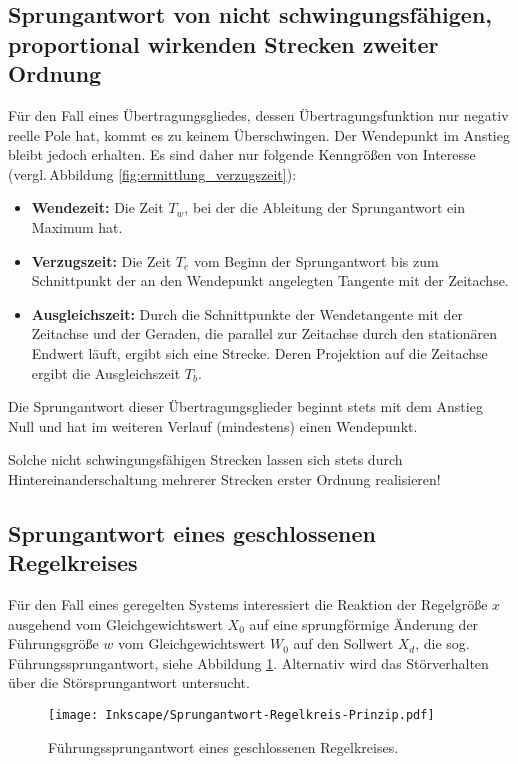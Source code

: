 \subsection{Sprungantwort von nicht schwingungsfähigen, proportional wirkenden Strecken zweiter Ordnung}
\label{sec:pt_2-glied-nicht}
Für den Fall eines Übertragungsgliedes, dessen Übertragungsfunktion nur negativ reelle Pole hat, kommt es zu keinem Überschwingen. Der Wendepunkt im Anstieg bleibt jedoch erhalten.
Es sind daher nur folgende Kenngrößen von Interesse (vergl.\,Abbildung \ref{fig:ermittlung_verzugszeit}):
\begin{itemize}
    \item \textbf{Wendezeit:} Die Zeit $T_w$, bei der die Ableitung der Sprungantwort ein Maximum hat.
    \item \textbf{Verzugszeit:} Die Zeit $T_e$ vom Beginn der Sprungantwort bis zum Schnittpunkt der an den Wendepunkt angelegten Tangente mit der Zeitachse.
    \item \textbf{Ausgleichszeit:} Durch die Schnittpunkte der Wendetangente mit der Zeitachse und der Geraden, die parallel zur Zeitachse durch den stationären Endwert läuft, ergibt sich eine Strecke. Deren Projektion auf die Zeitachse ergibt die Ausgleichszeit $T_b$.
\end{itemize}
Die Sprungantwort dieser Übertragungsglieder beginnt stets mit dem Anstieg Null und hat im weiteren Verlauf (mindestens) einen Wendepunkt.
\begin{RstWichtigBox}
    Solche nicht schwingungsfähigen Strecken lassen sich stets
    durch Hintereinanderschaltung mehrerer Strecken erster Ordnung
    realisieren!
\end{RstWichtigBox}
\subsection{Sprungantwort eines geschlossenen Regelkreises} \label{sec:SprungantwortRegelkreis}
Für den Fall eines geregelten Systems interessiert die Reaktion der Regelgröße $x$ ausgehend vom Gleichgewichtswert $X_0$ auf eine sprungförmige Änderung der Führungsgröße $w$ vom Gleichgewichtswert $W_0$ auf den Sollwert $X_d$, die sog.\,Führungssprungantwort, siehe Abbildung \ref{fig:Sprungantwort-RK-Prinzip}. Alternativ wird das Störverhalten über die Störsprungantwort untersucht.
\begin{figure}[ht]
    \centering
    \texttt{[image: Inkscape/Sprungantwort-Regelkreis-Prinzip.pdf]}
    \caption{Führungssprungantwort eines geschlossenen Regelkreises.}
    \label{fig:Sprungantwort-RK-Prinzip}
\end{figure}

